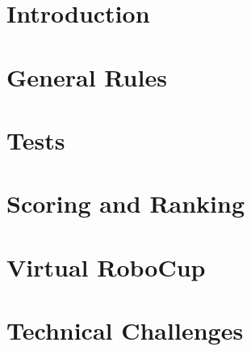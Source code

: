 \documentclass[11pt, twoside, openright, a4paper, chapterprefix]{scrbook}
\begin{document}


\pagestyle{empty}


\tableofcontents
\clearpage

\pagestyle{plain}




\chapter{Introduction}






\chapter{General Rules}



\chapter{Tests}



\chapter{Scoring and Ranking}


\chapter{Virtual RoboCup}
\label{cha: VRC}


\chapter{Technical Challenges} \label{cha:TechnicalChallenges}
\label{cha: TCHA}



%


%

%

%



\printabx
\printidx
\end{document}
